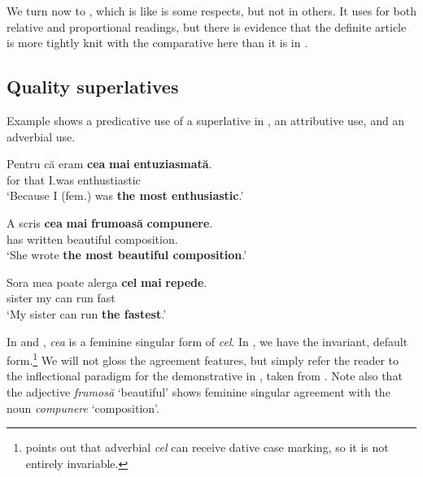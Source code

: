 \documentclass[output=paper
,modfonts
,nonflat]{langsci/langscibook}
\begin{document}
We turn now to , which is like  is some respects, but not in others. It uses  for both relative and proportional readings, but there is evidence that the definite article is more tightly knit with the comparative here than it is in .

\subsection{Quality superlatives}\largerpage[2]

Example  shows a predicative use of a superlative in ,  an attributive use, and  an adverbial use.

\ea \label{ex:coppockstrand:27}
\gll Pentru că eram \textbf{cea} \textbf{mai} \textbf{entuziasmată}.\\
for that I.was  \cmpr{} enthustiastic\\
\glt `Because I (fem.) was \textbf{the most enthusiastic}.' 
\z

\ea \label{ex:coppockstrand:28}
\gll A scris \textbf{cea} \textbf{mai} \textbf{frumoasă} \textbf{compunere}.\\
has written  \cmpr{} beautiful composition.\acc\\
\glt `She wrote \textbf{the most beautiful composition}.'
\z

\ea \label{ex:coppockstrand:29}
\gll Sora mea poate alerga \textbf{cel} \textbf{mai} \textbf{repede}.\\
sister my can run  \cmpr{} fast\\
\glt `My sister can run \textbf{the fastest}.'
\z

In  and , \textit{cea} is a feminine singular form of \textit{cel}.  In , we have the invariant, default form.\footnote{\citet[315]{PanaDindelgan2013} points out that adverbial \textit{cel} can receive dative case marking, so it is not entirely invariable.}
We will not gloss the agreement features, but simply refer the reader to the inflectional paradigm for the demonstrative in , taken from \citet[53]{Cojocaru2003}. 
Note also that the adjective \textit{frumosă} `beautiful' shows feminine singular agreement with the noun \textit{compunere} `composition'.
\end{document}
